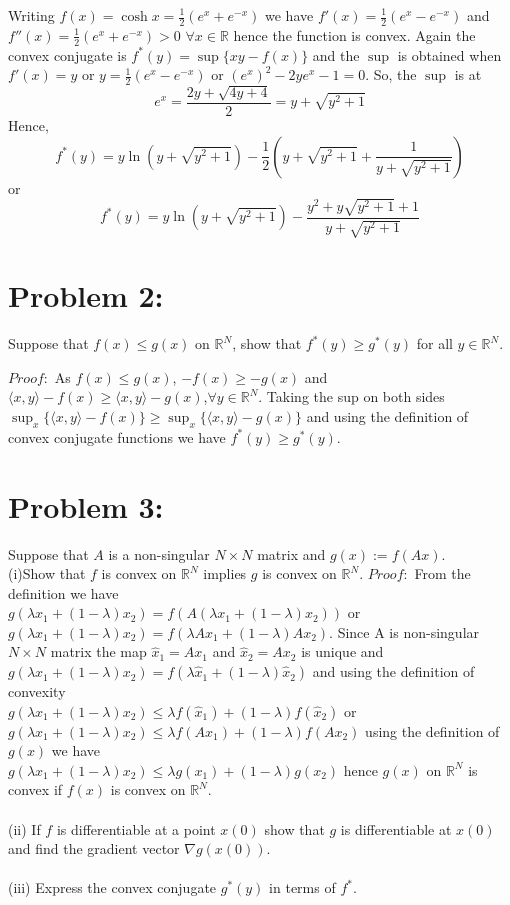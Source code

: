 \documentclass[12pt]{report}
\begin{document}
Writing $f(x)=\cosh x = \frac{1}{2}(e^x+e^{-x})$ we have $f'(x)=\frac{1}{2}(e^x-e^{-x})$ and $f''(x)=\frac{1}{2}(e^x+e^{-x})>0$ 
$\forall x\in \mathbb{R}$ hence the function is convex. Again the convex conjugate is $f^*(y)=\sup\{xy-f(x)\}$ and the $\sup$ is
obtained when $f'(x)=y$ or $y=\frac{1}{2}(e^x-e^{-x})$ or $(e^x)^2-2ye^x-1=0$. So, the $\sup$ is at
$$e^x= \frac{2y+\sqrt{4y+4}}{2} = y+\sqrt{y^2+1} $$ Hence, 
$$ f^*(y) = y \ln(y+\sqrt{y^2+1})  - \frac{1}{2}\left(y+\sqrt{y^2+1}+\frac{1}{y+\sqrt{y^2+1}} \right)  $$ or
$$ f^*(y) = y \ln(y+\sqrt{y^2+1}) - \frac{y^2+y\sqrt{y^2+1}+1}{y+\sqrt{y^2+1}} $$

\section*{Problem 2:}
Suppose that $f(x) \leq g(x)$ on $\mathbb{R}^N$, show that $f^*(y) \geq g^*(y)$ for all $y \in \mathbb{R}^N$.

$Proof:$ As $f(x) \leq g(x)$, $-f(x) \geq -g(x)$ and
$\langle x, y \rangle -f(x) \geq \langle x, y \rangle -g(x)$,$\forall y\in\mathbb{R}^N$. Taking the sup on both
sides $\sup_x\{\langle x,y \rangle-f(x)\} \geq \sup_x\{\langle x,y \rangle-g(x)\}$ and using the definition of convex conjugate
functions we have $f^*(y) \geq g^*(y)$.

\section*{Problem 3:}
Suppose that $A$ is a non-singular $N \times N$ matrix and $g(x) := f(Ax)$.\\
(i)Show that $f$ is convex on $\mathbb{R}^N$ implies $g$ is convex on $\mathbb{R}^N$.
$Proof:$ From the definition we have \\ $g(\lambda x_1+(1-\lambda )x_2) = f(A(\lambda x_1+(1-\lambda )x_2))$ or \\
$g(\lambda x_1+(1-\lambda )x_2) = f(\lambda Ax_1+(1-\lambda )Ax_2)$. Since A is non-singular $N \times N$ matrix the map
$\hat{x}_1=A x_1$ and $\hat{x}_2=A x_2$ is unique and \\
$g(\lambda x_1+(1-\lambda )x_2) = f(\lambda \hat{x}_1+(1-\lambda )\hat{x}_2)$ and using the definition of convexity \\
$g(\lambda x_1+(1-\lambda )x_2) \leq \lambda f(\hat{x}_1)+(1-\lambda )f(\hat{x}_2)$ or \\
$g(\lambda x_1+(1-\lambda )x_2) \leq \lambda f(Ax_1)+(1-\lambda )f(Ax_2)$ using the definition of $g(x)$ we have \\
$g(\lambda x_1+(1-\lambda )x_2) \leq \lambda g(x_1)+(1-\lambda )g(x_2)$ hence $g(x)$ on $\mathbb{R}^N$ is convex 
if $f(x)$ is convex on $\mathbb{R}^N$.
\\ \\
(ii) If $f$ is differentiable at a point $x(0)$ show that $g$ is differentiable at $x(0)$ and find the gradient vector 
$\nabla g(x(0))$.
\\
\\
(iii) Express the convex conjugate $g^*(y)$ in terms of $f^*$.
\end{document}
